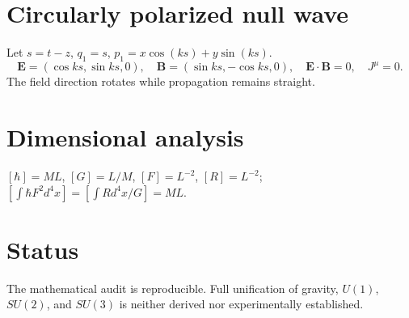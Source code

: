 \documentclass[11pt]{article}
\begin{document}
\section{Circularly polarized null wave}
Let $s=t-z$, $q_1=s$, $p_1=x\cos(ks)+y\sin(ks)$.
\begin{equation}\mathbf E=(\cos ks,\sin ks,0),\quad \mathbf B=(\sin ks,-\cos ks,0),\quad \mathbf E\cdot\mathbf B=0,\quad J^\mu=0.\end{equation}
The field direction rotates while propagation remains straight.
\section{Dimensional analysis}
$[\hbar]=ML$, $[G]=L/M$, $[F]=L^{-2}$, $[R]=L^{-2}$;
$[\int\hbar F^2 d^4x]=[\int R d^4x/G]=ML$.
\section{Status}
The mathematical audit is reproducible. Full unification of gravity, $U(1)$, $SU(2)$, and $SU(3)$ is neither derived nor experimentally established.
\end{document}
